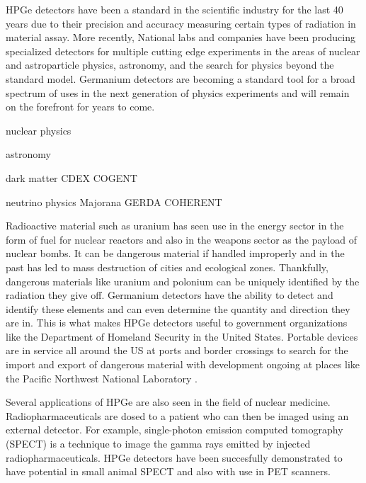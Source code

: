 HPGe detectors have been a standard in the scientific industry for the last 40 years due to their precision and accuracy measuring certain types of radiation in material assay.
More recently, National labs and companies have been producing specialized detectors for multiple cutting edge experiments in the areas of nuclear and astroparticle physics, astronomy, and the search for physics beyond the standard model.
Germanium detectors are becoming a standard tool for a broad spectrum of uses in the next generation of physics experiments and will remain on the forefront for years to come.

nuclear physics \cite{gretina} \cite{agata}

astronomy \cite{astronomy}

dark matter 
CDEX \cite{cdex}
COGENT \cite{cogent}

neutrino physics
Majorana \cite{majorana}
GERDA \cite{gerda}
COHERENT \cite{coherent}


Radioactive material such as uranium has seen use in the energy sector in the form of fuel for nuclear reactors and also in the weapons sector as the payload of nuclear bombs.
It can be dangerous material if handled improperly and in the past has led to mass destruction of cities and ecological zones.
Thankfully, dangerous materials like uranium and polonium can be uniquely identified by the radiation they give off.
Germanium detectors have the ability to detect and identify these elements and can even determine the quantity and direction they are in.
This is what makes HPGe detectors useful to government organizations like the Department of Homeland Security in the United States.
Portable devices are in service all around the US at ports and border crossings to search for the import and export of dangerous material with development ongoing at places like the Pacific Northwest National Laboratory \cite{StaveHS}.

Several applications of HPGe are also seen in the field of nuclear medicine.
Radiopharmaceuticals are dosed to a patient who can then be imaged using an external detector.
For example, single-photon emission computed tomography (SPECT) is a technique to image the gamma rays emitted by injected radiopharmaceuticals.
HPGe detectors have been succesfully demonstrated to have potential in small animal SPECT \cite{SPECT} and also with use in PET scanners.

